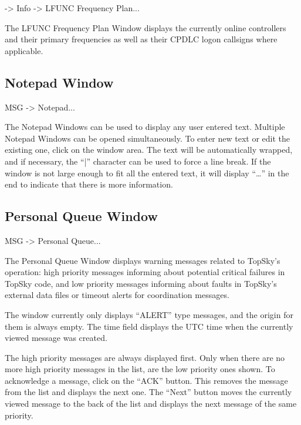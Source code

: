 \documentclass[a4paper,oneside,11pt]{memoir}
\begin{document}
 -> Info -> LFUNC Frequency Plan...

\bigskip


The LFUNC Frequency Plan Window displays the currently online controllers and their primary frequencies as well as their CPDLC logon callsigns where applicable.

\subsection{Notepad Window}
\label{win:note}

 MSG -> Notepad...

\bigskip


The Notepad Windows can be used to display any user entered text. Multiple Notepad Windows can be opened simultaneously. To enter new text or edit the existing one, click on the window area. The text will be automatically wrapped, and if necessary, the “|” character can be used to force a line break. If the window is not large enough to fit all the entered text, it will display “…” in the end to indicate that there is more information.

\subsection{Personal Queue Window}
\label{win:pqw}

 MSG -> Personal Queue...

\bigskip


The Personal Queue Window displays warning messages related to TopSky’s operation: high priority messages informing about potential critical failures in TopSky code, and low priority messages informing about faults in TopSky’s external data files or timeout alerts for coordination messages.

\bigskip

The window currently only displays “ALERT” type messages, and the origin for them is always empty. The time field displays the UTC time when the currently viewed message was created.

\bigskip

The high priority messages are always displayed first. Only when there are no more high priority messages in the list, are the low priority ones shown. To acknowledge a message, click on the “ACK” button. This removes the message from the list and displays the next one. The “Next” button moves the currently viewed message to the back of the list and displays the next message of the same priority.
\end{document}
